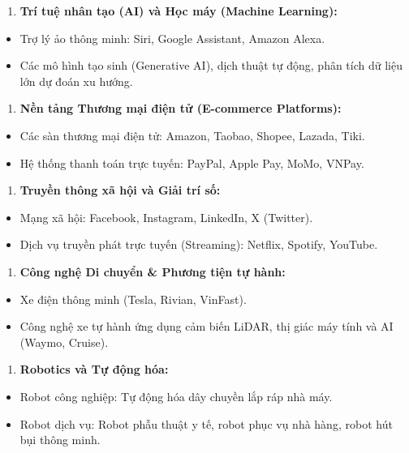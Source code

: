 \documentclass[11pt,a4paper,oneside]{report}
\begin{document}
\begin{enumerate}[leftmargin=1.5em]
\item \textbf{Trí tuệ nhân tạo (AI) và Học máy (Machine Learning):}
\end{enumerate}
\begin{itemize}[leftmargin=1.5em]
\item Trợ lý ảo thông minh: Siri, Google Assistant, Amazon Alexa.
\item Các mô hình tạo sinh (Generative AI), dịch thuật tự động, phân tích dữ liệu lớn dự đoán xu hướng.
\end{itemize}
\begin{enumerate}[leftmargin=1.5em]
\item \textbf{Nền tảng Thương mại điện tử (E-commerce Platforms):}
\end{enumerate}
\begin{itemize}[leftmargin=1.5em]
\item Các sàn thương mại điện tử: Amazon, Taobao, Shopee, Lazada, Tiki.
\item Hệ thống thanh toán trực tuyến: PayPal, Apple Pay, MoMo, VNPay.
\end{itemize}
\begin{enumerate}[leftmargin=1.5em]
\item \textbf{Truyền thông xã hội và Giải trí số:}
\end{enumerate}
\begin{itemize}[leftmargin=1.5em]
\item Mạng xã hội: Facebook, Instagram, LinkedIn, X (Twitter).
\item Dịch vụ truyền phát trực tuyến (Streaming): Netflix, Spotify, YouTube.
\end{itemize}
\begin{enumerate}[leftmargin=1.5em]
\item \textbf{Công nghệ Di chuyển \& Phương tiện tự hành:}
\end{enumerate}
\begin{itemize}[leftmargin=1.5em]
\item Xe điện thông minh (Tesla, Rivian, VinFast).
\item Công nghệ xe tự hành ứng dụng cảm biến LiDAR, thị giác máy tính và AI (Waymo, Cruise).
\end{itemize}
\begin{enumerate}[leftmargin=1.5em]
\item \textbf{Robotics và Tự động hóa:}
\end{enumerate}
\begin{itemize}[leftmargin=1.5em]
\item Robot công nghiệp: Tự động hóa dây chuyền lắp ráp nhà máy.
\item Robot dịch vụ: Robot phẫu thuật y tế, robot phục vụ nhà hàng, robot hút bụi thông minh.
\end{itemize}
\end{document}
